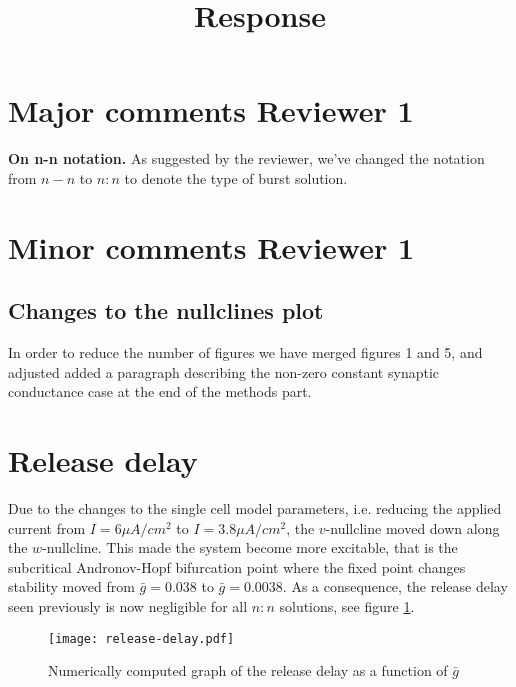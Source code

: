 \documentclass[utf8]{article} %
\begin{document}

\title{Response}
\maketitle

\section{Major comments Reviewer 1}
\textbf{On n-n notation.} As suggested by the reviewer, we've changed the notation from $n-n$ to $n:n$ to denote the type of burst solution.

\section{Minor comments Reviewer 1}

\subsection{Changes to the nullclines plot}
In order to reduce the number of figures we have merged figures 1 and 5, and adjusted added a paragraph describing the non-zero constant synaptic conductance case at the end of the methods part.

\section{Release delay}
Due to the changes to the single cell model parameters, i.e. reducing the applied current from $I=6 \si{\mu A/cm^{2}}$ to $I=3.8\si{\mu A/cm^{2}}$, the $v$-nullcline moved down along the $w$-nullcline.
This made the system become more excitable, that is the subcritical Andronov-Hopf bifurcation point where the fixed point changes stability moved from $\bar g=0.038$ to $\bar g=0.0038$.
As a consequence, the release delay seen previously is now negligible for all $n:n$ solutions, see figure \cref{fig:release-delay}.

\begin{figure}[h!]
  \centering
  \texttt{[image: release-delay.pdf]}
  \caption{Numerically computed graph of the release delay as a function of $\bar g$~\label{fig:release-delay}}
\end{figure}



\end{document}

